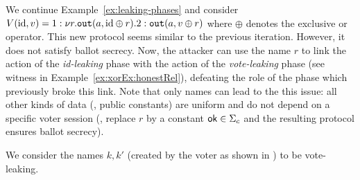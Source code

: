 \begin{example}
\label{ex:leaking-names}
  We continue Example~\ref{ex:leaking-phases} and consider
  $V(\mathrm{id},v) =
  1: \nu r.\mathtt{out}(a, \mathrm{id}\oplus r).2: \mathtt{out}(a, v\oplus r)$
  where $\oplus$ denotes the exclusive or operator.
  This new protocol seems similar to the previous
  iteration. However, it does not satisfy ballot secrecy.
  Now, the attacker can use the
  name $r$ to link the action of the {\em id-leaking} phase
  with the action of the {\em vote-leaking} phase (see witness in Example~\ref{ex:xorEx:honestRel}),
  defeating the role
  of the phase which previously broke this link. %
  Note that only names can lead to the this issue: all other kinds of data
  (\eg, public constants) are uniform and do not depend on a
  specific voter session (\eg, replace $r$ by a constant $\mathsf{ok}\in\Sigma_c$ and the
  resulting protocol ensures ballot secrecy).
\end{example}

\begin{example}
  \label{ex:foo-phase-name}
  We consider the names $k,k'$ (created by the voter as shown in )
  to be vote-leaking. %
\end{example}



